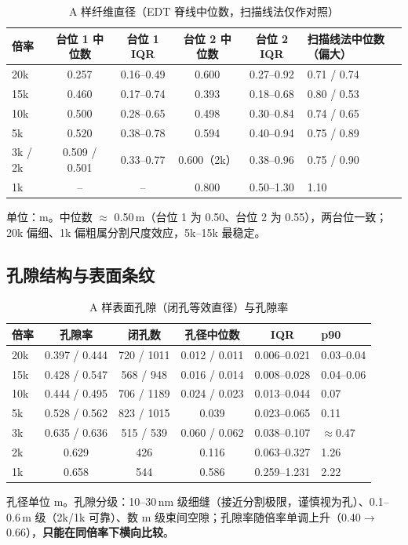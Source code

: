 \begin{table}[htbp]
\centering
\caption{A 样纤维直径（EDT 脊线中位数，扫描线法仅作对照）}
\begin{tabularx}{\textwidth}{l c c c c X}
\toprule
倍率 & 台位 1 中位数 & 台位 1 IQR & 台位 2 中位数 & 台位 2 IQR & 扫描线法中位数（偏大） \\
\midrule
20k & 0.257 & 0.16--0.49 & 0.600 & 0.27--0.92 & 0.71 / 0.74 \\
15k & 0.460 & 0.17--0.74 & 0.393 & 0.18--0.68 & 0.80 / 0.53 \\
10k & 0.500 & 0.28--0.65 & 0.498 & 0.30--0.84 & 0.74 / 0.65 \\
5k  & 0.520 & 0.38--0.78 & 0.594 & 0.40--0.94 & 0.75 / 0.89 \\
3k / 2k & 0.509 / 0.501 & 0.33--0.77 & 0.600（2k） & 0.38--0.96 & 0.75 / 0.90 \\
1k & -- & -- & 0.800 & 0.50--1.30 & 1.10 \\
\bottomrule
\end{tabularx}

{\small 单位：\textmu m。中位数 $\approx$ 0.50\,\textmu m（台位 1 为 0.50、台位 2 为 0.55），两台位一致；20k 偏细、1k 偏粗属分割尺度效应，5k--15k 最稳定。}
\end{table}

\subsection{孔隙结构与表面条纹}

\begin{table}[htbp]
\centering
\caption{A 样表面孔隙（闭孔等效直径）与孔隙率}
\begin{tabularx}{\textwidth}{l c c c c X}
\toprule
倍率 & 孔隙率 & 闭孔数 & 孔径中位数 & IQR & p90 \\
\midrule
20k & 0.397 / 0.444 & 720 / 1011 & 0.012 / 0.011 & 0.006--0.021 & 0.03--0.04 \\
15k & 0.428 / 0.547 & 568 / 948  & 0.016 / 0.014 & 0.008--0.028 & 0.04--0.06 \\
10k & 0.444 / 0.495 & 706 / 1189 & 0.024 / 0.023 & 0.013--0.044 & 0.07 \\
5k  & 0.528 / 0.562 & 823 / 1015 & 0.039 & 0.023--0.065 & 0.11 \\
3k  & 0.635 / 0.636 & 515 / 539  & 0.060 / 0.062 & 0.038--0.107 & $\approx$0.47 \\
2k  & 0.629 & 426 & 0.116 & 0.063--0.327 & 1.26 \\
1k  & 0.658 & 544 & 0.586 & 0.259--1.231 & 2.22 \\
\bottomrule
\end{tabularx}

{\small 孔径单位 \textmu m。孔隙分级：10--30\,nm 级细缝（接近分割极限，谨慎视为孔）、0.1--0.6\,\textmu m 级（2k/1k 可靠）、数 \textmu m 级束间空隙；孔隙率随倍率单调上升（0.40$\rightarrow$0.66），\textbf{只能在同倍率下横向比较}。}
\end{table}

